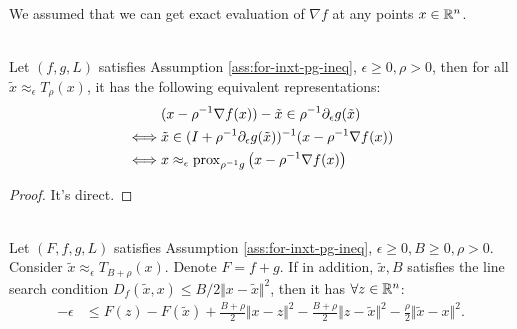 \documentclass[12pt]{article}
\begin{document}
        \begin{remark}
            We assumed that we can get exact evaluation of $\nabla f$ at any points $x \in \mathbb R^n$. 
        \end{remark}
        \begin{lemma}\;\label{lemma:other-repr-inxt-pg}\\
            Let $(f, g, L)$ satisfies Assumption \ref{ass:for-inxt-pg-ineq}, $\epsilon \ge 0, \rho > 0$, then for all $\tilde x \approx_\epsilon T_\rho(x)$, it has the following equivalent representations: 
            \begin{align*}
                & (x - \rho^{-1}\nabla f(x)) - \tilde x 
                \in \rho^{-1} \partial_\epsilon g(\tilde x)
                \\
                \iff 
                & \tilde x \in (I + \rho^{-1}\partial_\epsilon g(\tilde x))^{-1}
                (x - \rho^{-1}\nabla f(x))
                \\
                \iff 
                & x \approx_\epsilon \operatorname{prox}_{\rho^{-1} g}
                \left(x - \rho^{-1}\nabla f(x)\right)
            \end{align*}
        \end{lemma}
        \begin{proof}
            It's direct. 
        \end{proof}
        \begin{theorem}\;\label{thm:inxt-pg-ineq}\\
            Let $(F, f, g, L)$ satisfies Assumption \ref{ass:for-inxt-pg-ineq}, $\epsilon \ge 0, B \ge 0, \rho > 0$. 
            Consider $\tilde x \approx_\epsilon T_{B + \rho}(x)$. 
            Denote $F = f + g$. 
            If in addition, $\tilde x, B$ satisfies the line search condition $D_f(\tilde x, x) \le B/2\Vert x - \tilde x\Vert^2$, then it has $\forall z \in \mathbb R^n$: 
            \begin{align*}
                - \epsilon &\le 
                F(z) - F(\tilde x)
                + \frac{B + \rho}{2}\Vert x - z\Vert^2
                - \frac{B + \rho}{2}\Vert z - \tilde x\Vert^2
                - \frac{\rho}{2}\Vert \tilde x - x\Vert^2. 
            \end{align*}
        \end{theorem}
\end{document}
